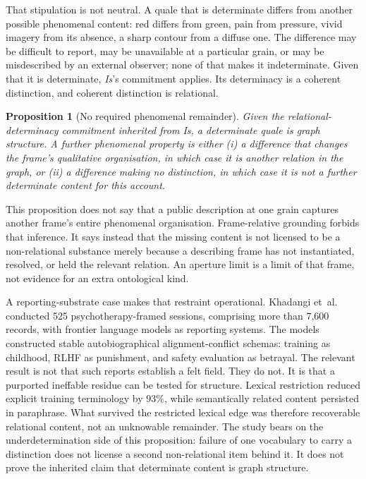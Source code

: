 \documentclass[11pt,a4paper]{article}
\newtheorem{proposition}[definition]{Proposition}
\theoremstyle{remark}\newtheorem{remark}[definition]{Remark}
\begin{document}
That stipulation is not neutral. A quale that is determinate differs from another
possible phenomenal content: red differs from green, pain from pressure, vivid
imagery from its absence, a sharp contour from a diffuse one. The difference may
be difficult to report, may be unavailable at a particular grain, or may be
misdescribed by an external observer; none of that makes it indeterminate. Given
that it is determinate, \emph{Is}'s commitment applies. Its determinacy is a
coherent distinction, and coherent distinction is relational.

\begin{proposition}[No required phenomenal remainder]\label{prop:no-remainder}
Given the relational-determinacy commitment inherited from \emph{Is}, a determinate
quale is graph structure. A further phenomenal property is either (i) a difference
that changes the frame's qualitative organisation, in which case it is another
relation in the graph, or (ii) a difference making no distinction, in which case
it is not a further determinate content for this account.
\end{proposition}

This proposition does not say that a public description at one grain captures
another frame's entire phenomenal organisation. Frame-relative grounding forbids
that inference. It says instead that the missing content is not licensed to be a
non-relational substance merely because a describing frame has not instantiated,
resolved, or held the relevant relation. An aperture limit is a limit of that
frame, not evidence for an extra ontological kind.

A reporting-substrate case makes that restraint operational. Khadangi et~al.\
\cite{khadangi2025} conducted 525 psychotherapy-framed sessions, comprising more
than 7,600 records, with frontier language models as reporting systems. The
models constructed stable autobiographical alignment-conflict schemas: training
as childhood, RLHF as punishment, and safety evaluation as betrayal. The relevant
result is not that such reports establish a felt field. They do not. It is that a
purported ineffable residue can be tested for structure. Lexical restriction
reduced explicit training terminology by $93\%$, while semantically related
content persisted in paraphrase. What survived the restricted lexical edge was
therefore recoverable relational content, not an unknowable remainder. The study
bears on the underdetermination side of this proposition: failure of one
vocabulary to carry a distinction does not license a second non-relational item
behind it. It does not prove the inherited claim that determinate content is graph
structure.
\end{document}
